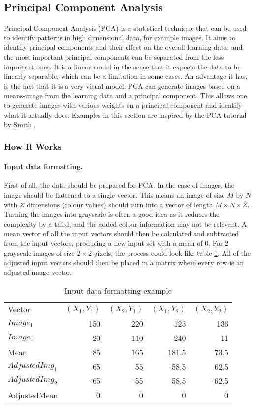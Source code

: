 \subsection{Principal Component Analysis}
\label{sub:PCA}
Principal Component Analysis (PCA) is a statistical technique that can be used to identify patterns in high dimensional data, for example images.
It aims to identify principal components and their effect on the overall learning data, and the most important principal components can be separated from the less important ones.
It is a linear model in the sense that it expects the data to be linearly separable, which can be a limitation in some cases.
An advantage it has, is the fact that it is a very visual model.
PCA can generate images based on a means-image from the learning data and a principal component.
This allows one to generate images with various weights on a principal component and identify what it actually does.
Examples in this section are inspired by the PCA tutorial by Smith \cite{smith2002tutorial}.

\subsubsection{How It Works}
\paragraph{Input data formatting.}
First of all, the data should be prepared for PCA.
In the case of images, the image should be flattened to a single vector.
This means an image of size $M$ by $N$ with $Z$ dimensions (colour values) should turn into a vector of length $M\times N\times Z$.
Turning the images into grayscale is often a good idea as it reduces the complexity by a third, and the added colour information may not be relevant.
A mean vector of all the input vectors should then be calculated and subtracted from the input vectors, producing a new input set with a mean of 0.
For 2 grayscale images of size $2\times 2$ pixels, the process could look like table \ref{tab:formattingexample}.
All of the adjusted input vectors should then be placed in a matrix where every row is an adjusted image vector.

\begin{table}[h!]
\centering
\begin{tabular}{l|rrrr}
\hline
\noalign{\smallskip}
Vector & $(X_1, Y_1)$ & $(X_2, Y_1)$ & $(X_1, Y_2)$ & $(X_2, Y_2)$\\
\noalign{\smallskip}
\hline
\noalign{\smallskip}
$Image_1$ & 150 & 220 & 123 & 136 \\
$Image_2$ & 20 & 110 & 240 & 11 \\
Mean & 85 & 165 & 181.5 & 73.5 \\
$AdjustedImg_1$ & 65  & 55 & -58.5 & 62.5 \\
$AdjustedImg_2$ & -65 & -55 & 58.5 & -62.5 \\
AdjustedMean & 0 & 0 & 0 & 0 \\
\hline
\end{tabular}
\caption{Input data formatting example}\label{tab:formattingexample}
\end{table}

